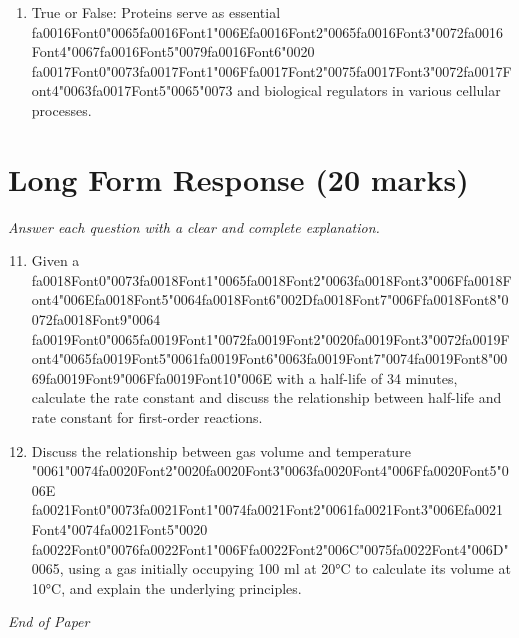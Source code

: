\documentclass[12pt]{article}
\begin{document}
\begin{enumerate}[label=\arabic*.]
\item True or False: Proteins serve as essential {\csname fa0016Font0\endcsname\char"0065}{\csname fa0016Font1\endcsname\char"006E}{\csname fa0016Font2\endcsname\char"0065}{\csname fa0016Font3\endcsname\char"0072}{\csname fa0016Font4\endcsname\char"0067}{\csname fa0016Font5\endcsname\char"0079}{\csname fa0016Font6\endcsname\char"0020} {\csname fa0017Font0\endcsname\char"0073}{\csname fa0017Font1\endcsname\char"006F}{\csname fa0017Font2\endcsname\char"0075}{\csname fa0017Font3\endcsname\char"0072}{\csname fa0017Font4\endcsname\char"0063}{\csname fa0017Font5\endcsname\char"0065}{\char"0073} and biological regulators in various cellular processes.
\end{enumerate}

\section*{Long Form Response (20 marks)}
\textit{Answer each question with a clear and complete explanation.}
\begin{enumerate}[label=\arabic*.]
\setcounter{enumi}{10}
\item Given a {\csname fa0018Font0\endcsname\char"0073}{\csname fa0018Font1\endcsname\char"0065}{\csname fa0018Font2\endcsname\char"0063}{\csname fa0018Font3\endcsname\char"006F}{\csname fa0018Font4\endcsname\char"006E}{\csname fa0018Font5\endcsname\char"0064}{\csname fa0018Font6\endcsname\char"002D}{\csname fa0018Font7\endcsname\char"006F}{\csname fa0018Font8\endcsname\char"0072}{\csname fa0018Font9\endcsname\char"0064} {\csname fa0019Font0\endcsname\char"0065}{\csname fa0019Font1\endcsname\char"0072}{\csname fa0019Font2\endcsname\char"0020}{\csname fa0019Font3\endcsname\char"0072}{\csname fa0019Font4\endcsname\char"0065}{\csname fa0019Font5\endcsname\char"0061}{\csname fa0019Font6\endcsname\char"0063}{\csname fa0019Font7\endcsname\char"0074}{\csname fa0019Font8\endcsname\char"0069}{\csname fa0019Font9\endcsname\char"006F}{\csname fa0019Font10\endcsname\char"006E} with a half-life of 34 minutes, calculate the rate constant
and discuss the relationship between half-life and rate constant for first-order
reactions.
\item Discuss the relationship between gas volume and temperature {\char"0061}{\char"0074}{\csname fa0020Font2\endcsname\char"0020}{\csname fa0020Font3\endcsname\char"0063}{\csname fa0020Font4\endcsname\char"006F}{\csname fa0020Font5\endcsname\char"006E} {\csname fa0021Font0\endcsname\char"0073}{\csname fa0021Font1\endcsname\char"0074}{\csname fa0021Font2\endcsname\char"0061}{\csname fa0021Font3\endcsname\char"006E}{\csname fa0021Font4\endcsname\char"0074}{\csname fa0021Font5\endcsname\char"0020} {\csname fa0022Font0\endcsname\char"0076}{\csname fa0022Font1\endcsname\char"006F}{\csname fa0022Font2\endcsname\char"006C}{\char"0075}{\csname fa0022Font4\endcsname\char"006D}{\char"0065}, using a
gas initially occupying 100 ml at 20°C to calculate its volume at 10°C, and explain the
underlying principles.
\end{enumerate}

\vfill
\noindent\textit{End of Paper}
\end{document}
